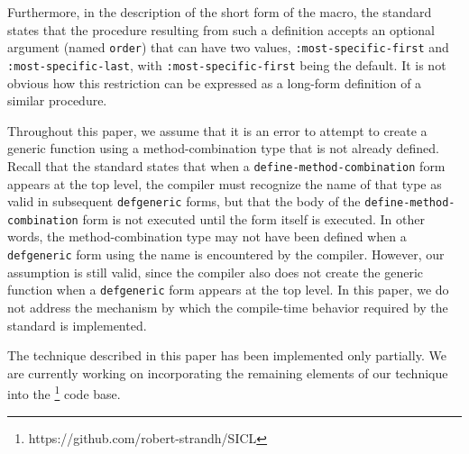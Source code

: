Furthermore, in the description of the short form of the macro, the
standard states that the procedure resulting from such a definition
accepts an optional argument (named \texttt{order}) that can have two
values, \texttt{:most-specific-first} and
\texttt{:most-specific-last}, with \texttt{:most-specific-first} being
the default.  It is not obvious how this restriction can be expressed
as a long-form definition of a similar procedure.

Throughout this paper, we assume that it is an error to attempt to
create a generic function using a method-combination type that is not
already defined.  Recall that the standard states that when a
\texttt{define-method-combination} form appears at the top level, the
compiler must recognize the name of that type as valid in subsequent
\texttt{defgeneric} forms, but that the body of the
\texttt{define-method-combination} form is not executed until the form
itself is executed.  In other words, the method-combination type may
not have been defined when a \texttt{defgeneric} form using the name
is encountered by the compiler.  However, our assumption is still
valid, since the compiler also does not create the generic function
when a \texttt{defgeneric} form appears at the top level.  In this
paper, we do not address the mechanism by which the compile-time
behavior required by the standard is implemented.

The technique described in this paper has been implemented only
partially.  We are currently working on incorporating the remaining
elements of our technique into the \sicl{}%
\footnote{https://github.com/robert-strandh/SICL}
code base.
